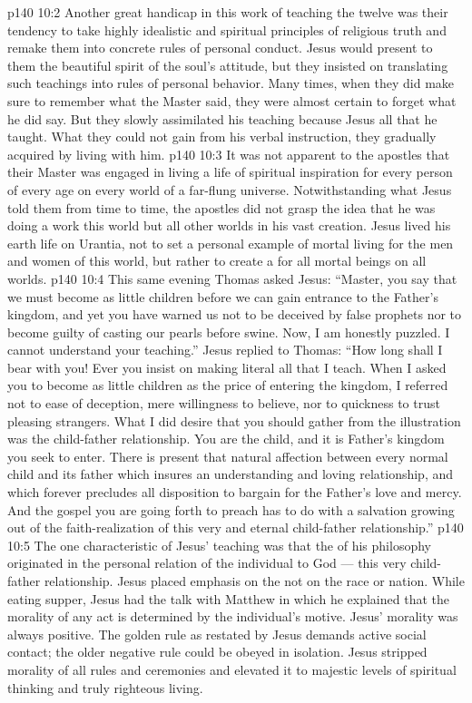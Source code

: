 \vs p140 10:2 \pc Another great handicap in this work of teaching the twelve was their tendency to take highly idealistic and spiritual principles of religious truth and remake them into concrete rules of personal conduct. Jesus would present to them the beautiful spirit of the soul’s attitude, but they insisted on translating such teachings into rules of personal behavior. Many times, when they did make sure to remember what the Master said, they were almost certain to forget what he did  say. But they slowly assimilated his teaching because Jesus  all that he taught. What they could not gain from his verbal instruction, they gradually acquired by living with him.
\vs p140 10:3 It was not apparent to the apostles that their Master was engaged in living a life of spiritual inspiration for every person of every age on every world of a far\hyp{}flung universe. Notwithstanding what Jesus told them from time to time, the apostles did not grasp the idea that he was doing a work  this world but  all other worlds in his vast creation. Jesus lived his earth life on Urantia, not to set a personal example of mortal living for the men and women of this world, but rather to create a  for all mortal beings on all worlds.
\vs p140 10:4 \pc This same evening Thomas asked Jesus: “Master, you say that we must become as little children before we can gain entrance to the Father’s kingdom, and yet you have warned us not to be deceived by false prophets nor to become guilty of casting our pearls before swine. Now, I am honestly puzzled. I cannot understand your teaching.” Jesus replied to Thomas: \textcolor{ubdarkred}{“How long shall I bear with you! Ever you insist on making literal all that I teach. When I asked you to become as little children as the price of entering the kingdom, I referred not to ease of deception, mere willingness to believe, nor to quickness to trust pleasing strangers. What I did desire that you should gather from the illustration was the child\hyp{}father relationship. You are the child, and it is  Father’s kingdom you seek to enter. There is present that natural affection between every normal child and its father which insures an understanding and loving relationship, and which forever precludes all disposition to bargain for the Father’s love and mercy. And the gospel you are going forth to preach has to do with a salvation growing out of the faith\hyp{}realization of this very and eternal child\hyp{}father relationship.”}
\vs p140 10:5 \pc The one characteristic of Jesus’ teaching was that the  of his philosophy originated in the personal relation of the individual to God --- this very child\hyp{}father relationship. Jesus placed emphasis on the  not on the race or nation. While eating supper, Jesus had the talk with Matthew in which he explained that the morality of any act is determined by the individual’s motive. Jesus’ morality was always positive. The golden rule as restated by Jesus demands active social contact; the older negative rule could be obeyed in isolation. Jesus stripped morality of all rules and ceremonies and elevated it to majestic levels of spiritual thinking and truly righteous living.

